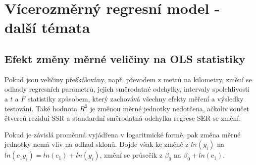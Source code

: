 \chapter[Vícerozměrný regresní model \\ Další témata]{Vícerozměrný regresní model - další témata}

\section{Efekt změny měrné veličiny na OLS statistiky}

Pokud jsou veličiny přeškálovány, např. převodem z metrů na kilometry, změní se odhady regresních parametrů, jejich směrodatné 
odchylky, intervaly spolehlivosti a $t$ a $F$ statistiky způsobem, který zachovává všechny efekty měření a výsledky testování. Také 
hodnota $R^2$ je změnou měrné jednotky nedotčena, ačkoliv součet čtverců reziduí SSR a standardní směrodatná odchylka regrese SER se změní.

Pokud je závislá proměnná vyjádřena v logaritmické formě, pak změna měrné jednotky nemá vliv na odhad sklonů. Dojde však ke změně z 
$ln(y_i)$ na $ln(c_1 y_i) = ln(c_1) + ln(y_i)$, změní se průsečík z $\beta_0$ na $\beta_0 + ln(c_1)$.

